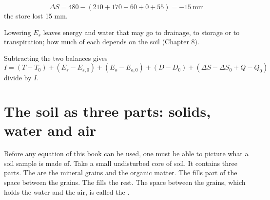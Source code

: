 \sol {}\ans \[\Delta S=480-(210+170+60+0+55)=-15\ \text{mm}\]
the store lost 15 mm. \finans

\sol  Lowering $E_s$ leaves energy and water that may go to drainage, to storage or to transpiration; how much of each depends on the soil (Chapter 8). \finans

\sol  Subtracting the two balances gives \[I=(T-T_0)+(E_s-E_{s,0})+(E_o-E_{o,0})+(D-D_0)+(\Delta S-\Delta S_0+Q-Q_0)\]
divide by $I$.
\section{The soil as three parts: solids, water and air}
Before any equation of this book can be used, one must be able to picture what a soil sample is made of. Take a small undisturbed core of soil. It contains three parts. The  are the mineral grains and the organic matter. The  fills part of the space between the grains. The  fills the rest. The space between the grains, which holds the water and the air, is called the .

